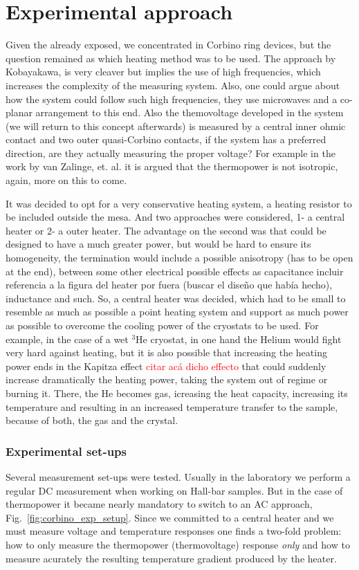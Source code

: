 \chapter{Experimental approach}

Given the already exposed, we concentrated in Corbino ring devices, but the question remained as which heating method was to be used. The approach by Kobayakawa, \etal \cite{kobayakawa2013diffusion} is very cleaver but implies the use of high frequencies, which increases the complexity of the measuring system. Also, one could argue about how the system could follow such high frequencies, they use microwaves and a co-planar arrangement to this end. Also the themovoltage developed in the system (we will return to this concept afterwards) is measured by a central inner ohmic contact and two outer quasi-Corbino contacts, if the system has a preferred direction, are they actually measuring the proper voltage? For example in the work by van Zalinge, et. al. \cite{Zalinge2003} it is argued that the thermopower is not isotropic, again, more on this to come.

It was decided to opt for a very conservative heating system, a heating resistor to be included outside the mesa. And two approaches were considered, 1- a central heater or 2- a outer heater. The advantage on the second was that could be designed to have a much greater power, but would be hard to ensure its homogeneity, the termination would include a possible anisotropy (has to be open at the end), between some other electrical possible effects as capacitance \textcolor{tmagenta}{incluir referencia a la figura del heater por fuera (buscar el diseño que había hecho)}, inductance and such. 
So, a central heater was decided, which had to be small to resemble as much as possible a point heating system and support as much power as possible to overcome the cooling power of the cryostats to be used. For example, in the case of a wet \(^3\)He cryostat, in one hand the Helium would fight very hard against heating, but it is also possible that increasing the heating power ends in the Kapitza effect \textcolor{red}{citar acá dicho effecto} that could suddenly increase dramatically the heating power, taking the system out of regime or burning it. There, the He becomes gas, icreasing the heat capacity, increasing its temperature and resulting in an increased temperature transfer to the sample, because of both, the gas and the crystal.

\subsection{Experimental set-ups}
\label{subsec:experimental_setup}
Several measurement set-ups were tested. Usually in the laboratory we perform a regular DC measurement when working on Hall-bar samples. But in the case of thermopower it became nearly mandatory to switch to an AC approach, Fig.~\ref{fig:corbino_exp_setup}. Since we committed to a central heater and we must measure voltage and temperature responses one finds a two-fold problem: how to only measure the thermopower (thermovoltage) response \textit{only} and how to measure acurately the resulting temperature gradient produced by the heater.

